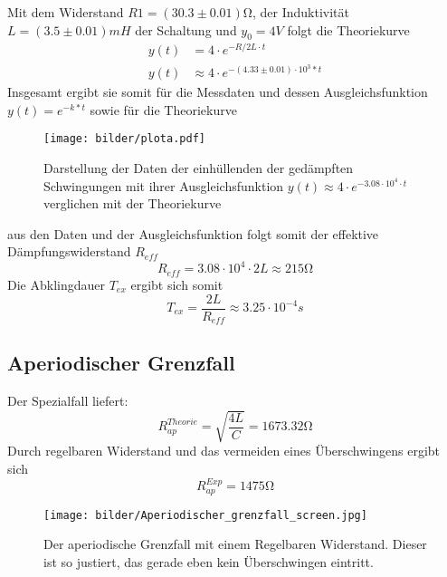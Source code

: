 Mit dem Widerstand $R1=(30.3\pm0.01)\si{\ohm}$, der Induktivität $L=(3.5 \pm 0.01)mH$ der Schaltung und $y_0=4V$ folgt die Theoriekurve
\begin{align}
    y(t)&=4 \cdot e^{-R/2L \cdot t}\\
    y(t)&\approx 4 \cdot e^{-(4.33\pm0.01) \cdot 10^3*t}
\end{align}
\newpage
Insgesamt ergibt sie somit für die Messdaten und dessen Ausgleichsfunktion $y(t)=e^{-k*t}$
sowie für die Theoriekurve
\begin{figure}
    \centering
    \texttt{[image: bilder/plota.pdf]}
    \caption{
        Darstellung der Daten der einhüllenden der gedämpften Schwingungen mit ihrer
        Ausgleichsfunktion $y(t)\approx 4 \cdot e^{-3.08\cdot10^4 \cdot t}$ verglichen mit der Theoriekurve
    }
    \label{fig:ultra_plot}
\end{figure}
aus den Daten und der Ausgleichsfunktion folgt somit der effektive Dämpfungswiderstand 
$R_{eff}$
\begin{equation}
    R_{eff}= 3.08\cdot10^4 \cdot 2L \approx 215\si{\ohm}
\end{equation}
Die Abklingdauer $T_{ex}$ ergibt sich somit
\begin{equation}
    T_{ex}=\frac{2L}{R_{eff}}\approx 3.25 \cdot 10^{-4}s
\end{equation}






\subsection{Aperiodischer Grenzfall}
Der Spezialfall liefert:
\begin{equation}
    R_{ap}^{Theorie}=\sqrt{\frac{4L}{C}}=1673.32\si{\ohm}     %
\end{equation}
Durch regelbaren Widerstand und das vermeiden eines Überschwingens ergibt sich
\begin{equation}
    R_{ap}^{Exp}=1475\si{\ohm}
\end{equation}
\begin{figure}
    \centering
    \texttt{[image: bilder/Aperiodischer\_grenzfall\_screen.jpg]}
    \caption{Der aperiodische Grenzfall mit einem Regelbaren Widerstand. Dieser ist so justiert, das gerade eben kein Überschwingen eintritt.}    %
\end{figure} 
\newpage







